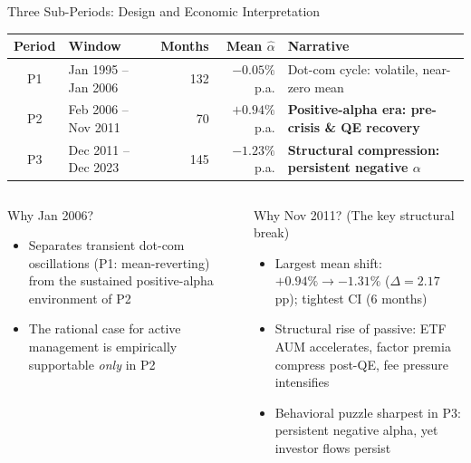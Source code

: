 \documentclass[aspectratio=169,10pt]{beamer}
\newcommand{\red}[1]{\textcolor{AlertRed}{\textbf{#1}}}
\newcommand{\green}[1]{\textcolor{SkillGreen}{\textbf{#1}}}
\begin{document}
\begin{frame}{Three Sub-Periods: Design and Economic Interpretation}
\begin{center}
\setlength{\tabcolsep}{6pt}
\small
\begin{tabular}{clrrl}
\toprule
\textbf{Period} & \textbf{Window} & \textbf{Months} & \textbf{Mean $\hat{\alpha}$} & \textbf{Narrative}\\
\midrule
P1 & Jan 1995 – Jan 2006 & 132 & $-0.05\%$ p.a. & Dot-com cycle: volatile, near-zero mean\\
P2 & Feb 2006 – Nov 2011 & \phantom{0}70 & $\mathbf{+0.94\%}$ p.a. & \green{Positive-alpha era: pre-crisis \& QE recovery}\\
\rowcolor{AlertRed!10}
P3 & Dec 2011 – Dec 2023 & 145 & $\mathbf{-1.23\%}$ p.a. & \red{Structural compression: persistent negative $\alpha$}\\
\bottomrule
\end{tabular}
\end{center}
\vspace{3pt}
\begin{columns}[T]
\begin{block}{Why Jan 2006?}
{\footnotesize
\begin{itemize}
  \item Separates transient dot-com oscillations (P1: mean-reverting) from the sustained positive-alpha environment of P2
  \item The rational case for active management is empirically supportable \emph{only} in P2
\end{itemize}}
\end{block}

\begin{block}{Why Nov 2011? (The key structural break)}
{\footnotesize
\begin{itemize}
  \item Largest mean shift: $+0.94\% \to -1.31\%$ ($\Delta = 2.17$ pp); tightest CI (6 months)
  \item Structural rise of passive: ETF AUM accelerates, factor premia compress post-QE, fee pressure intensifies
  \item Behavioral puzzle sharpest in P3: persistent negative alpha, yet investor flows persist
\end{itemize}}
\end{block}
\end{columns}
\end{frame}
\end{document}

